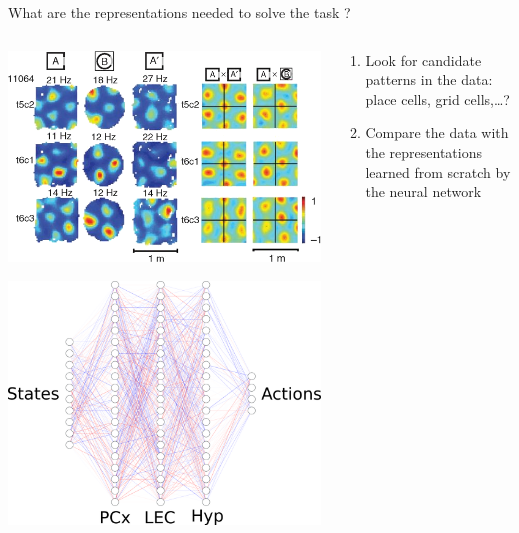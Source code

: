 \documentclass[bigger]{beamer}
\begin{document}
\begin{frame}[label={sec:org83f12bc}]{What are the representations needed to solve the task ?}
\begin{columns}
\begin{column}{0.5\columnwidth}
\begin{center}
\includegraphics[height=0.25\textheight]{img/place-cells-grid-cells.jpg.png}
\end{center}
\begin{center}
\includegraphics[height=0.25\textheight]{img/nn.svg.png}
\end{center}
\end{column}
\begin{column}{0.5\columnwidth}
\begin{enumerate}
\item Look for candidate patterns in the data: place cells, grid cells,\dots{}?
\item Compare the data with the representations learned from scratch by the neural network
\end{enumerate}


\end{column}
\end{columns}
\end{frame}
\end{document}
